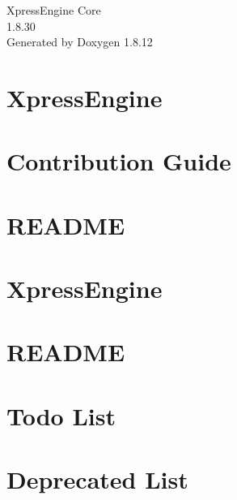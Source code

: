 \documentclass[twoside]{book}
\newcommand{\+}{\discretionary{\mbox{\scriptsize$\hookleftarrow$}}{}{}}
\newcommand{\clearemptydoublepage}{%
  \newpage{\pagestyle{empty}\cleardoublepage}%
}
\begin{document}
\hypersetup{pageanchor=false,
             bookmarksnumbered=true,
             pdfencoding=unicode
            }
\begin{titlepage}
\vspace*{7cm}
\begin{center}%
{\Large Xpress\+Engine Core \\[1ex]\large 1.\+8.\+30 }\\
\vspace*{1cm}
{\large Generated by Doxygen 1.8.12}\\
\end{center}
\end{titlepage}
\clearemptydoublepage
{}
\tableofcontents
\clearemptydoublepage
{}
\hypersetup{pageanchor=true}

\chapter{Xpress\+Engine}
\label{index}\hypertarget{index}{}
\chapter{Contribution Guide}
\label{md_CONTRIBUTING}
\hypertarget{md_CONTRIBUTING}{}

\chapter{R\+E\+A\+D\+ME}
\label{md_doxygen_README}
\hypertarget{md_doxygen_README}{}

\chapter{Xpress\+Engine}
\label{md_README}
\hypertarget{md_README}{}

\chapter{R\+E\+A\+D\+ME}
\label{md_xe-manual-api_README}
\hypertarget{md_xe-manual-api_README}{}

\chapter{Todo List}
\label{todo}
\hypertarget{todo}{}

\chapter{Deprecated List}
\label{deprecated}
\hypertarget{deprecated}{}

\end{document}
